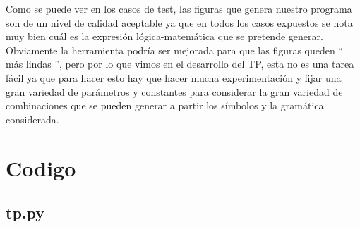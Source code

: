 \documentclass[a4paper, 10pt, twoside]{article}
\begin{document}
Como se puede ver en los casos de test, las figuras que genera nuestro programa son de un nivel de calidad aceptable ya que en todos los casos expuestos se nota muy bien cuál es la expresión lógica-matemática que se pretende generar. Obviamente la herramienta podría ser mejorada para que las figuras queden `` más lindas '', pero por lo que vimos en el desarrollo del TP, esta no es una tarea fácil ya que para hacer esto hay que hacer mucha experimentación y fijar una gran variedad de parámetros y constantes para considerar la gran variedad de combinaciones que se pueden generar a partir los símbolos y la gramática considerada.


\section{Codigo}


\subsection{tp.py}
%
\end{document}
